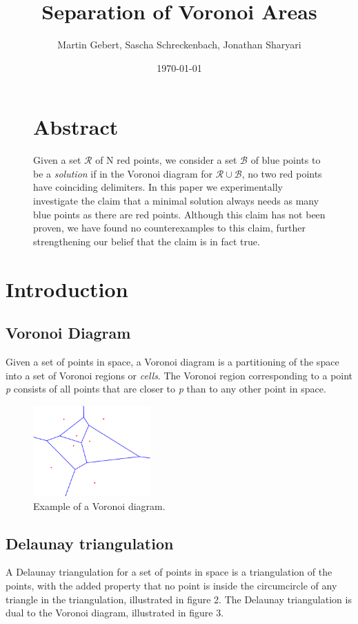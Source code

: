 \documentclass[a4paper,12pt]{article}
\title{\textbf{Separation of Voronoi Areas}}
\author{Martin Gebert, Sascha Schreckenbach, Jonathan Sharyari}  %
\date{\today}
\begin{document}
\maketitle

\begin{figure}
\section*{\large Abstract}
Given a set $\mathcal{R}$ of N red points, we consider a set  $\mathcal{B}$ of blue points to be a \emph{solution} if in the Voronoi diagram for  $\mathcal{R}\cup\mathcal{B}$, no two red points have coinciding delimiters. In this paper we experimentally investigate the claim that a minimal solution always needs as many blue points as there are red points. Although this claim has not been proven, we have found no counterexamples to this claim, further strengthening our belief that the claim is in fact true.
\end{figure}
\newpage

\tableofcontents
\newpage

\section{Introduction}
\subsection{Voronoi Diagram}
Given a set of points in space, a Voronoi diagram is a partitioning of the space into a set of Voronoi regions or \emph{cells}. The Voronoi region corresponding to a point \emph{p} consists of all points that are closer to \emph{p} than to any other point in space.

\begin{figure}[hb]
\centering
\includegraphics[width=0.4\textwidth]{pictures/Voronoi-diagram.png}
 \caption[Close up of \textit{Hemidactylus} sp.]
{Example of a Voronoi diagram.}
\end{figure}

\subsection{Delaunay triangulation}
A Delaunay triangulation for a set of points in space is a triangulation of the points, with the added property that no point is inside the circumcircle of any triangle in the triangulation, illustrated in figure 2. The Delaunay triangulation is dual to the Voronoi diagram, illustrated in figure 3.
\end{document}
